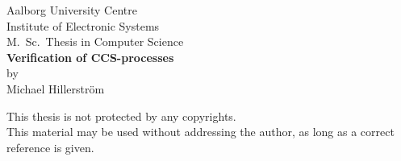 \begin{titlepage}
\begin{center}
\large Aalborg University Centre\\
Institute of Electronic Systems\\
M.~Sc.~Thesis in Computer Science\\[4cm]

\huge {\bf Verification of CCS-processes}\\
\Large by\\
\Large Michael Hillerstr\"om\\

\vfill
\begin{flushleft}
\scriptsize
This thesis is not protected by any copyrights.\\
This material may be used without addressing the author, as long as a correct reference is given.
\end{flushleft}
\end{center}
\end{titlepage}
